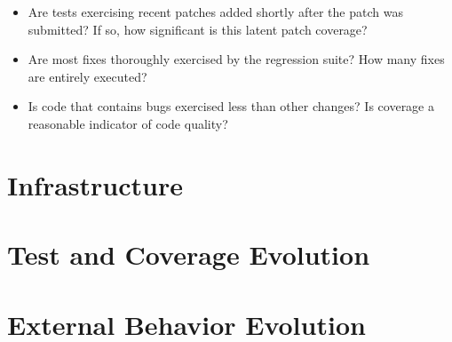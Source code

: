 \begin{itemize}
\item[\textssc{RQ7}] \textit{\rqseven}  Are
            tests exercising recent patches added shortly after the
            patch was submitted?  If so, how significant is this
            latent patch coverage?

\item[\textssc{RQ8}] \textit{\rqeight}
            Are most fixes thoroughly exercised by the regression
            suite?  How many fixes are entirely executed?

\item[\textssc{RQ9}] \textit{\rqnine}
            Is code that contains bugs exercised less than other changes?
            Is coverage a reasonable indicator of code quality? 

\end{itemize}

\section{\covrig Infrastructure}
\label{sec:design}


\section{Test and Coverage Evolution}
\label{sec:coverage-evolution}


\section{External Behavior Evolution}
\label{sec:behavior-evolution}

